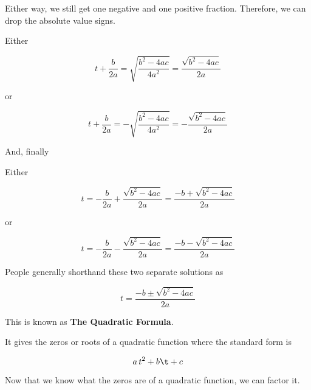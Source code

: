 \documentclass{ximera}
\begin{document}
Either way, we still get one negative and one positive fraction.  Therefore, we can drop the absolute value signs.  





Either 


\[ t + \frac{b}{2 a}  = \sqrt{\frac{b^2 - 4 a c}{4 a^2}}  = \frac{\sqrt{b^2 - 4 a c}}{2a}   \]

or


\[ t + \frac{b}{2 a}  = -\sqrt{\frac{b^2 - 4 a c}{4 a^2}} = -\frac{\sqrt{b^2 - 4 a c}}{2a}    \]










And, finally \\


\begin{conclusion}



Either 


\[ t   = - \frac{b}{2 a} + \frac{\sqrt{b^2 - 4 a c}}{2a}  = \frac{-b + \sqrt{b^2 - 4 a c}}{2a}      \]

or


\[ t  = - \frac{b}{2 a}  -\frac{\sqrt{b^2 - 4 a c}}{2a} =    \frac{-b - \sqrt{b^2 - 4 a c}}{2a}      \]

\end{conclusion}






People generally shorthand these two separate solutions as



\[ t  =   \frac{-b \pm \sqrt{b^2 - 4 a c}}{2a}      \]


This is known as \textbf{The Quadratic Formula}.


It gives the zeros or roots of a quadratic function where the standard form is 

\[
a \, t^2 + b \t + c
\]



Now that we know what the zeros are of a quadratic function, we can factor it.
\end{document}
